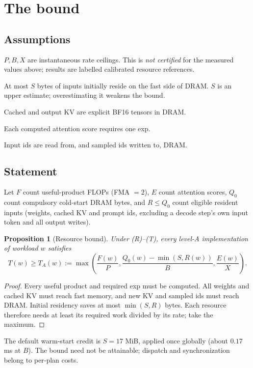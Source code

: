 \documentclass[11pt]{article}
\newtheorem{proposition}{Proposition}
\theoremstyle{definition}
\theoremstyle{remark}
\begin{document}
\section{The bound}\label{sec:bound}
\subsection{Assumptions}
\begin{description}[nosep,leftmargin=1.5em]
\item[(R) Rates.] $P,B,X$ are instantaneous rate ceilings. This is \emph{not certified} for the measured
values above; results are labelled calibrated resource references.
\item[(C) Capacity.] At most $S$ bytes of inputs initially reside on the fast side of DRAM.
$S$ is an upper estimate; overestimating it weakens the bound.
\item[(K) KV.] Cached and output KV are explicit BF16 tensors in DRAM.
\item[(E) Softmax.] Each computed attention score requires one exp.
\item[(T) Tokens.] Input ids are read from, and sampled ids written to, DRAM.
\end{description}

\subsection{Statement}
Let $F$ count useful-product FLOPs (FMA $=2$), $E$ count attention scores, $Q_0$ count compulsory
cold-start DRAM bytes, and $R\le Q_0$ count eligible resident inputs (weights, cached KV and prompt
ids, excluding a decode step's own input token and all output writes).
\begin{proposition}[Resource bound]\label{prop:main}
Under (R)--(T), every level-A implementation of workload $w$ satisfies
\begin{equation}\label{eq:main}
T(w)\ge T_A(w):=\max\left(\frac{F(w)}{P},\frac{Q_0(w)-\min(S,R(w))}{B},\frac{E(w)}{X}\right).
\end{equation}
\end{proposition}
\begin{proof}
Every useful product and required exp must be computed. All weights and cached KV must reach fast
memory, and new KV and sampled ids must reach DRAM. Initial residency saves at most $\min(S,R)$ bytes.
Each resource therefore needs at least its required work divided by its rate; take the maximum.
\end{proof}
The default warm-start credit is $S=17$ MiB, applied once globally (about $0.17$ ms at $B$).
The bound need not be attainable; dispatch and synchronization belong to per-plan costs.
\end{document}

